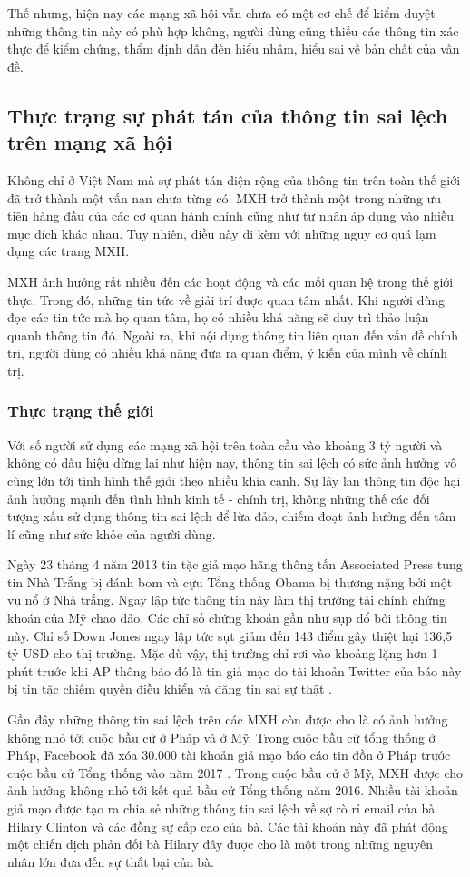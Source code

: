 		Thế nhưng, hiện nay các mạng xã hội vẫn chưa có một cơ chế để kiểm duyệt những thông tin này có phù hợp không, người dùng cũng thiếu các thông tin xác thực để kiểm chứng, thẩm định dẫn đến hiểu nhầm, hiểu sai về bản chất của vấn đề.
	\subsection{Thực trạng sự phát tán của thông tin sai lệch trên mạng xã hội }
	Không chỉ ở Việt Nam mà sự phát tán diện rộng của thông tin trên toàn thế giới đã trở thành một vấn nạn chưa từng có. MXH trở thành một trong những ưu tiên hàng đầu của các cơ quan hành chính cũng như tư nhân áp dụng vào nhiều mục đích khác nhau. Tuy nhiên, điều này đi kèm với những nguy cơ quá lạm dụng các trang MXH.
	
	MXH ảnh hưởng rất nhiều đến các hoạt động và các mối quan hệ trong thế giới thực. Trong đó, những tin tức về giải trí được quan tâm nhất. Khi người dùng đọc các tin tức mà họ quan tâm, họ có nhiều khả năng sẽ duy trì thảo luận quanh thông tin đó. Ngoài ra, khi nội dụng thông tin liên quan đến vấn đề chính trị, người dùng có nhiều khả năng đưa ra quan điểm, ý kiến của mình về chính trị.
		\subsubsection{Thực trạng thế giới}
		Với số người sử dụng các mạng xã hội trên toàn cầu vào khoảng 3 tỷ người và không có dấu hiệu dừng lại như hiện nay, thông tin sai lệch có sức ảnh hưởng vô cùng lớn tới tình hình thế giới theo nhiều khía cạnh. Sự lây lan thông tin độc hại ảnh hưởng mạnh đến tình hình kinh tế - chính trị, không những thế các đối tượng xấu sử dụng thông tin sai lệch để lừa đảo, chiếm đoạt ảnh hưởng đến tâm lí cũng như sức khỏe của người dùng.
		 
		Ngày 23 tháng 4 năm 2013 tin tặc giả mạo hãng thông tấn Associated Press tung tin Nhà Trắng bị đánh bom và cựu Tổng thống Obama bị thương nặng bởi một vụ  nổ ở Nhà trắng. Ngay lập tức thông tin này làm thị trường tài chính chứng khoán của Mỹ chao đảo. Các chỉ số chứng khoán gần như sụp đổ bởi thông tin này. Chỉ số Down Jones ngay lập tức sụt giảm đến 143 điểm gây thiệt hại 136,5 tỷ USD cho thị trường. Mặc dù vậy, thị trường chỉ rơi vào khoảng lặng hơn 1 phút trước khi AP thông báo đó là tin giả mạo do tài khoản Twitter của báo này bị tin tặc chiếm quyền điều khiển và đăng tin sai sự thật \cite{APhack}.
		
		Gần đây những thông tin sai lệch trên các MXH còn được cho là có ảnh hưởng không nhỏ tới cuộc bầu cử ở Pháp và ở Mỹ. Trong cuộc bầu cử tổng thống ở Pháp, Facebook đã xóa 30.000 tài khoản giả mạo báo cáo tin đồn ở Pháp trước cuộc bầu cử Tổng thống vào năm 2017 \cite{Anhhuong}. Trong cuộc bầu cử ở Mỹ, MXH được cho ảnh hưởng không nhỏ tới kết quả bầu cử Tổng thống năm 2016. Nhiều tài khoản giả mạo được tạo ra chia sẻ những thông tin sai lệch về sợ rò rỉ email của bà Hilary Clinton và các đồng sự cấp cao của bà. Các tài khoản này đã phát động một chiến dịch phản đối bà Hilary đây được cho là một trong những nguyên nhân lớn đưa đến sự thất bại của bà.
		
